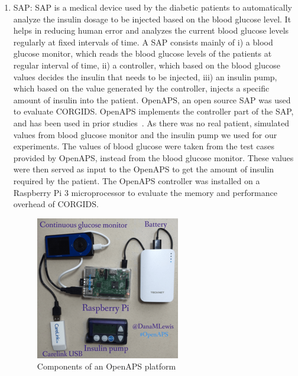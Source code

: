 \begin{enumerate}
\item \acf{SAP}: \ac{SAP} is a medical device used by the diabetic patients to automatically analyze the insulin dosage to be injected based on the blood glucose level. It helps in reducing human error and analyzes the current blood glucose levels regularly at fixed intervals of time. A \ac{SAP} consists mainly of i) a blood glucose monitor, which reads the blood glucose levels of the patients at regular interval of time, ii) a controller, which based on the blood glucose values decides the insulin that needs to be injected, iii) an insulin pump, which based on the value generated by the controller, injects a specific amount of insulin into the patient. \acf{OpenAPS}, an open source \ac{SAP} was used to evaluate \ac{CORGIDS}. \ac{OpenAPS} implements the controller part of the \ac{SAP}, and has been used in prior studies~\cite{aliabadi2017artinali}. As there was no real patient, simulated values from blood glucose monitor and the insulin pump we used for our experiments. The values of blood glucose were taken from the test cases provided by \ac{OpenAPS}, instead from the blood glucose monitor. These values were then served as input to the \ac{OpenAPS} to get the amount of insulin required by the patient. The OpenAPS controller was installed on a Raspberry Pi 3 microprocessor to evaluate the memory and performance overhead of \ac{CORGIDS}.

\begin{figure}[ht]
    \centering
    \includegraphics[scale=0.75,keepaspectratio = true]{Graphics/openaps.png}
    \caption{Components of an OpenAPS platform}
    \label{fig:OpenAPS}
\end{figure}
\end{enumerate}

